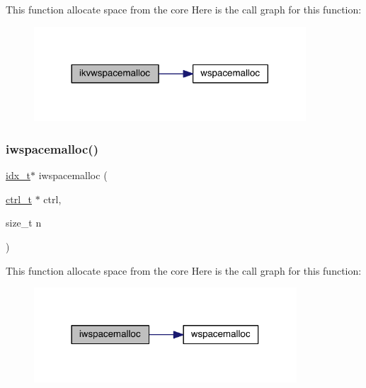 This function allocate space from the core Here is the call graph for this function\+:\nopagebreak
\begin{figure}[H]
\begin{center}
\leavevmode
\includegraphics[width=288pt]{a00984_accf7db8ecb7288f18eaf02d58cbb1244_cgraph}
\end{center}
\end{figure}
\mbox{\label{a00984_ac838f4c6cb4f30b2888cbea0003ffc61}} 
\subsubsection{\texorpdfstring{iwspacemalloc()}{iwspacemalloc()}}
{\footnotesize\ttfamily \hyperlink{a00876_aaa5262be3e700770163401acb0150f52}{idx\+\_\+t}$\ast$ iwspacemalloc (\begin{DoxyParamCaption}\item[{\hyperlink{a00742}{ctrl\+\_\+t} $\ast$}]{ctrl,  }\item[{size\+\_\+t}]{n }\end{DoxyParamCaption})}

This function allocate space from the core Here is the call graph for this function\+:\nopagebreak
\begin{figure}[H]
\begin{center}
\leavevmode
\includegraphics[width=278pt]{a00984_ac838f4c6cb4f30b2888cbea0003ffc61_cgraph}
\end{center}
\end{figure}
\mbox{\label{a00984_adfa1dc5e723d63f32672d993e3f52e4f}} 

